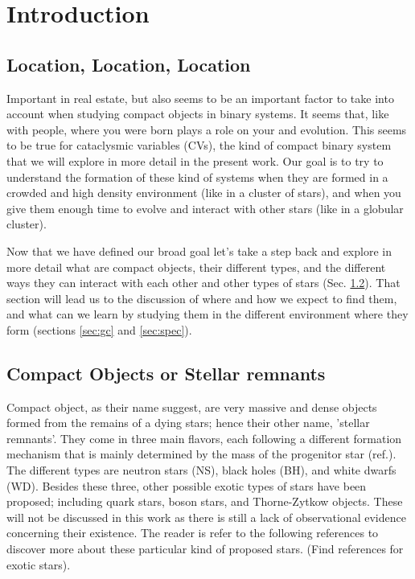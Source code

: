 \chapter{Introduction}
\thispagestyle{fancy}

\section{Location, Location, Location}

Important in real estate, but also seems to be an important factor to take into account when studying compact objects in binary systems. It seems that, like with people, where you were born plays a role on your and evolution. This seems to be true for cataclysmic variables (CVs), the kind of compact binary system that we will explore in more detail in the present work. Our goal is to try to understand the formation of these kind of systems when they are formed in a crowded and high density environment (like in a cluster of stars), and when you give them enough time to evolve and interact with other stars (like in a globular cluster).  

Now that we have defined our broad goal let's take a step back and explore in more detail what are compact objects, their different types, and the different ways they can interact with each other and other types of stars (Sec. \ref{sec:co}). That section will lead us to the discussion of where and how we expect to find them, and what can we learn by studying them in the different environment where they form (sections \ref{sec:gc} and \ref{sec:spec}).

\section{Compact Objects or Stellar remnants}\label{sec:co}

Compact object, as their name suggest, are very massive and dense objects formed from the remains of a dying stars; hence their other name, 'stellar remnants'. They come in three main flavors, each following a different formation mechanism that is mainly determined by the mass of the progenitor star (ref.). The different types are neutron stars (NS), black holes (BH), and white dwarfs (WD). Besides these three, other possible exotic types of stars have been proposed; including quark stars, boson stars, and Thorne-Zytkow objects. These will not be discussed in this work as there is still a lack of observational evidence concerning their existence. The reader is refer to the following references to discover more about these particular kind of proposed stars. (Find references for exotic stars). 

